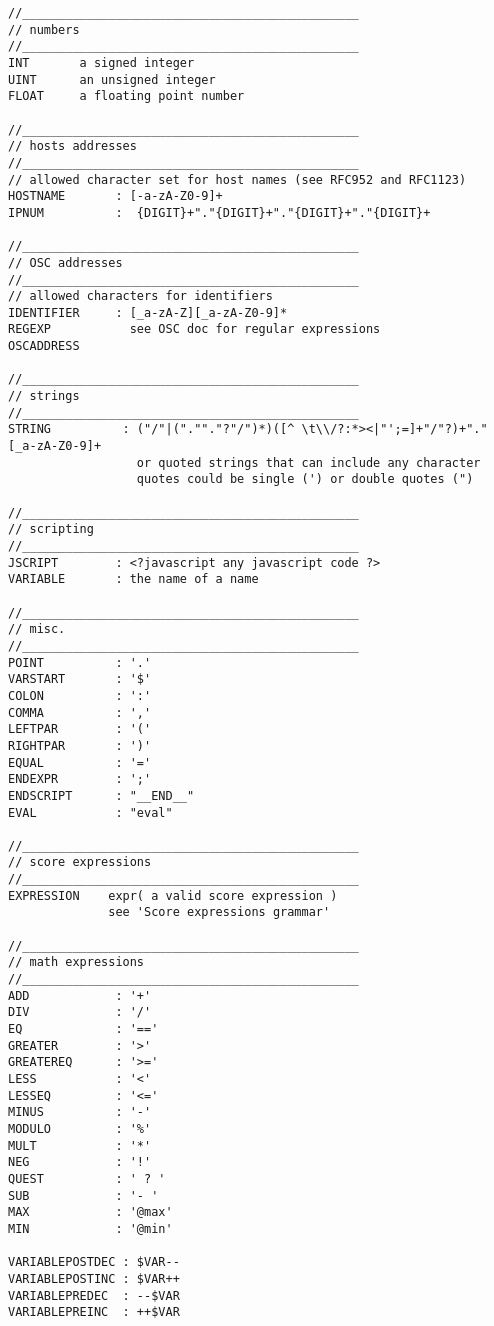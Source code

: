 \begin{verbatim}
//_______________________________________________
// numbers
//_______________________________________________
INT       a signed integer
UINT      an unsigned integer
FLOAT     a floating point number

//_______________________________________________
// hosts addresses
//_______________________________________________
// allowed character set for host names (see RFC952 and RFC1123)
HOSTNAME       : [-a-zA-Z0-9]+ 
IPNUM          :  {DIGIT}+"."{DIGIT}+"."{DIGIT}+"."{DIGIT}+

//_______________________________________________
// OSC addresses
//_______________________________________________
// allowed characters for identifiers
IDENTIFIER     : [_a-zA-Z][_a-zA-Z0-9]*
REGEXP           see OSC doc for regular expressions
OSCADDRESS

//_______________________________________________
// strings
//_______________________________________________
STRING          : ("/"|(".""."?"/")*)([^ \t\\/?:*><|"';=]+"/"?)+"."[_a-zA-Z0-9]+
                  or quoted strings that can include any character
                  quotes could be single (') or double quotes (")

//_______________________________________________
// scripting
//_______________________________________________
JSCRIPT        : <?javascript any javascript code ?>
VARIABLE       : the name of a name

//_______________________________________________
// misc.
//_______________________________________________
POINT          : '.'
VARSTART       : '$'
COLON          : ':'
COMMA          : ','
LEFTPAR        : '('
RIGHTPAR       : ')'
EQUAL          : '='
ENDEXPR        : ';'
ENDSCRIPT      : "__END__"
EVAL           : "eval"

//_______________________________________________
// score expressions
//_______________________________________________
EXPRESSION    expr( a valid score expression )
              see 'Score expressions grammar'

//_______________________________________________
// math expressions
//_______________________________________________
ADD            : '+'
DIV            : '/'
EQ             : '=='
GREATER        : '>'
GREATEREQ      : '>='
LESS           : '<'
LESSEQ         : '<='
MINUS          : '-'
MODULO         : '%'
MULT           : '*'
NEG            : '!'
QUEST          : ' ? '
SUB            : '- '
MAX            : '@max' 
MIN            : '@min'

VARIABLEPOSTDEC : $VAR--
VARIABLEPOSTINC : $VAR++
VARIABLEPREDEC  : --$VAR
VARIABLEPREINC  : ++$VAR

\end{verbatim}

